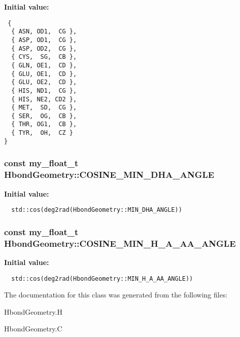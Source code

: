 \textbf{Initial value:}

\begin{Code}\begin{verbatim} {
  { ASN, OD1,  CG },
  { ASP, OD1,  CG },
  { ASP, OD2,  CG },
  { CYS,  SG,  CB },
  { GLN, OE1,  CD },
  { GLU, OE1,  CD },
  { GLU, OE2,  CD },
  { HIS, ND1,  CG },  
  { HIS, NE2, CD2 },  
  { MET,  SD,  CG },  
  { SER,  OG,  CB },
  { THR, OG1,  CB },
  { TYR,  OH,  CZ }
}
\end{verbatim}\end{Code}
\subsubsection{\setlength{\rightskip}{0pt plus 5cm}const my\_\-float\_\-t Hbond\-Geometry::COSINE\_\-MIN\_\-DHA\_\-ANGLE\hspace{0.3cm}{\tt  [static, private]}}\label{classSimSite3D_1_1HbondGeometry_7aa28706a8d3851bfd42ad2f6e159d72}


\textbf{Initial value:}

\begin{Code}\begin{verbatim} 
  std::cos(deg2rad(HbondGeometry::MIN_DHA_ANGLE))
\end{verbatim}\end{Code}
\subsubsection{\setlength{\rightskip}{0pt plus 5cm}const my\_\-float\_\-t Hbond\-Geometry::COSINE\_\-MIN\_\-H\_\-A\_\-AA\_\-ANGLE\hspace{0.3cm}{\tt  [static, private]}}\label{classSimSite3D_1_1HbondGeometry_228f234e37eba913cebf3cdfa004c590}


\textbf{Initial value:}

\begin{Code}\begin{verbatim} 
  std::cos(deg2rad(HbondGeometry::MIN_H_A_AA_ANGLE))
\end{verbatim}\end{Code}


The documentation for this class was generated from the following files:\begin{CompactItemize}
\item 
Hbond\-Geometry.H\item 
Hbond\-Geometry.C\end{CompactItemize}
